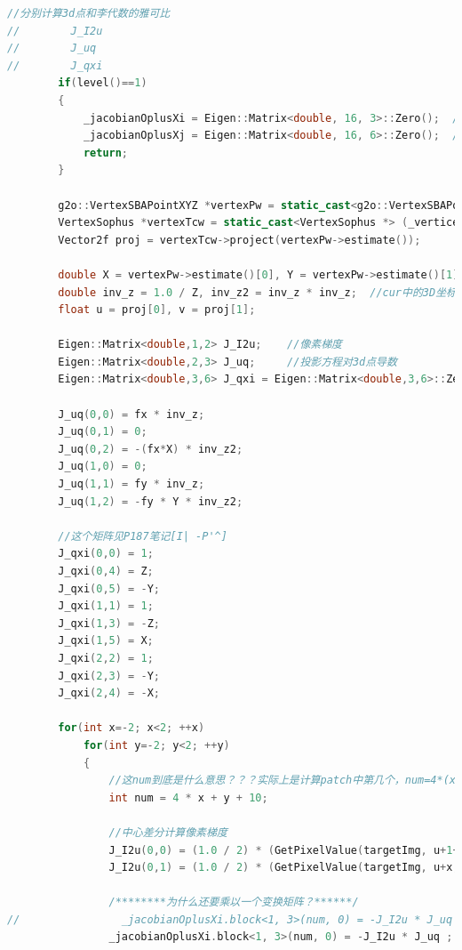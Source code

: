 \documentclass[40pt,a4paper，UTF8]{ctexart}
\numberwithin{equation}{section}
\begin{document}
\begin{lstlisting}[language=C++, caption=Direct\_BA.cpp]
        //分别计算3d点和李代数的雅可比
//        J_I2u
//        J_uq
//        J_qxi
        if(level()==1)
        {
            _jacobianOplusXi = Eigen::Matrix<double, 16, 3>::Zero();  //因为_error是(D,1)的，D=16是4*4的patch，所以对第一个顶点的雅可比就是16*2*2*3=16*3的
            _jacobianOplusXj = Eigen::Matrix<double, 16, 6>::Zero();  //同理，对第二个顶点(李代数顶点)的雅可比是16*2*2*3*3*6=16*6的
            return;
        }

        g2o::VertexSBAPointXYZ *vertexPw = static_cast<g2o::VertexSBAPointXYZ *> (_vertices[0]);
        VertexSophus *vertexTcw = static_cast<VertexSophus *> (_vertices[1]);
        Vector2f proj = vertexTcw->project(vertexPw->estimate());

        double X = vertexPw->estimate()[0], Y = vertexPw->estimate()[1], Z = vertexPw->estimate()[2];
        double inv_z = 1.0 / Z, inv_z2 = inv_z * inv_z;  //cur中的3D坐标X'Y'Z'
        float u = proj[0], v = proj[1];

        Eigen::Matrix<double,1,2> J_I2u;    //像素梯度
        Eigen::Matrix<double,2,3> J_uq;     //投影方程对3d点导数
        Eigen::Matrix<double,3,6> J_qxi = Eigen::Matrix<double,3,6>::Zero();    //3d点对李代数导数

        J_uq(0,0) = fx * inv_z;
        J_uq(0,1) = 0;
        J_uq(0,2) = -(fx*X) * inv_z2;
        J_uq(1,0) = 0;
        J_uq(1,1) = fy * inv_z;
        J_uq(1,2) = -fy * Y * inv_z2;

        //这个矩阵见P187笔记[I| -P'^]
        J_qxi(0,0) = 1;
        J_qxi(0,4) = Z;
        J_qxi(0,5) = -Y;
        J_qxi(1,1) = 1;
        J_qxi(1,3) = -Z;
        J_qxi(1,5) = X;
        J_qxi(2,2) = 1;
        J_qxi(2,3) = -Y;
        J_qxi(2,4) = -X;

        for(int x=-2; x<2; ++x)
            for(int y=-2; y<2; ++y)
            {
                //这num到底是什么意思？？？实际上是计算patch中第几个，num=4*(x+2)+(y+2)=4x+y+10
                int num = 4 * x + y + 10;

                //中心差分计算像素梯度
                J_I2u(0,0) = (1.0 / 2) * (GetPixelValue(targetImg, u+1+x, v+y)-GetPixelValue(targetImg, u-1+x, v+y));
                J_I2u(0,1) = (1.0 / 2) * (GetPixelValue(targetImg, u+x, v+1+y)-GetPixelValue(targetImg, u+x, v-1+y));

                /********为什么还要乘以一个变换矩阵？******/
//                _jacobianOplusXi.block<1, 3>(num, 0) = -J_I2u * J_uq * vertexTcw->estimate().rotationMatrix();
                _jacobianOplusXi.block<1, 3>(num, 0) = -J_I2u * J_uq ;


\end{lstlisting}
\end{document}
